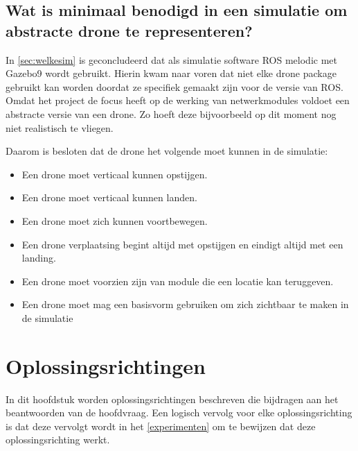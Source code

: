 \documentclass[a4paper, 11pt, oneside]{report}
\begin{document}
 


\section{Wat is minimaal benodigd in een simulatie om abstracte drone te representeren?}
\label{sec:dronekeuze}

In \autoref{sec:welkesim} is geconcludeerd dat als simulatie software ROS melodic met Gazebo9 wordt gebruikt.
Hierin kwam naar voren dat niet elke drone package gebruikt kan worden doordat ze specifiek gemaakt zijn voor de versie van ROS.
Omdat het project de focus heeft op de werking van netwerkmodules voldoet een abstracte versie van een drone.
Zo hoeft deze bijvoorbeeld op dit moment nog niet realistisch te vliegen.

Daarom is besloten dat de drone het volgende moet kunnen in de simulatie:

\begin{itemize}
	\item Een drone moet verticaal kunnen opstijgen.
	\item Een drone moet verticaal kunnen landen.
	\item Een drone moet zich kunnen voortbewegen.
	\item Een drone verplaatsing begint altijd met opstijgen en eindigt altijd met een landing.
	\item Een drone moet voorzien zijn van module die een locatie kan teruggeven. 
	\item Een drone moet mag een basisvorm gebruiken om zich zichtbaar te maken in de simulatie
\end{itemize}


\chapter{Oplossingsrichtingen}



In dit hoofdstuk worden oplossingsrichtingen beschreven die bijdragen aan het beantwoorden van de hoofdvraag. 
Een logisch vervolg voor elke oplossingsrichting is dat deze vervolgt wordt in het \autoref{experimenten}  om te bewijzen dat deze oplossingsrichting werkt.
\end{document}

